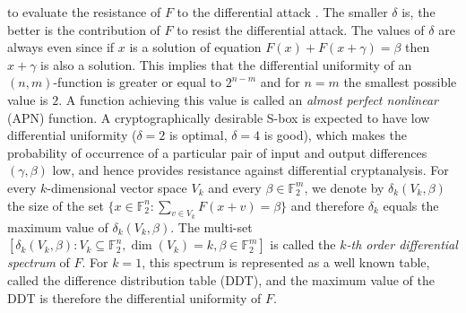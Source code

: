 \documentclass[12 pt]{article}
\def\F{{\mathbb F}}
\begin{document}
to evaluate the resistance of $F$ to the differential attack \cite{BS91}. The smaller $\delta$ is, the better is the contribution of $F$ to resist the differential attack. The values of
$\delta$ are always even since if $x$ is a solution of equation $F(x)+ F(x+\gamma)=\beta$ then $x+\gamma$ is also a solution. This implies that the differential uniformity of an $(n,m)$-function
is greater or equal to $2^{n-m}$ and for $n=m$ the smallest possible value is $2$. A function achieving this value is called an {\it almost perfect nonlinear} (APN) function.
A cryptographically desirable S-box is expected to have low differential uniformity ($\delta=2$ is optimal, $\delta=4$ is good), which makes the probability of occurrence of a particular pair
of input and output differences $(\gamma, \beta )$ low, and hence provides resistance against differential cryptanalysis. For every $k$-dimensional vector space $V_k$ and every $\beta\in\F_2^m$,
we denote by $\delta_k(V_k,\beta)$ the size of the set $\{x\in\F_2^n : \sum_{v\in V_k}F(x+v)=\beta\}$ and therefore $\delta_k$ equals the maximum value of $\delta_k(V_k,\beta)$. The multi-set
$[\delta_k(V_k,\beta) : V_k\subseteq\F_2^n, \dim(V_k)=k, \beta\in\F_2^m]$ is called the \textit{$k$-th order differential spectrum} of $F$. For $k=1$, this spectrum is represented as a well
known table, called the difference distribution table (DDT), and the maximum value of the DDT is therefore the differential uniformity of $F$.
\end{document}
